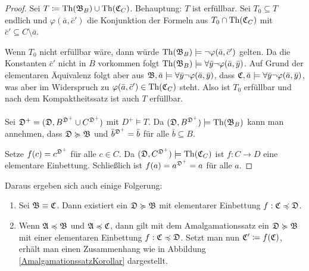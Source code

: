 \begin{proof}
	Sei $T\coloneqq \operatorname{Th}(\mathfrak{B}_B)\cup \operatorname{Th}(\mathfrak{C}_C)$. Behauptung: $T$ ist erfüllbar. Sei $T_0\subseteq T$ endlich und $\varphi(\bar{a},\bar{c}')$ die Konjunktion der Formeln aus $T_0\cap \operatorname{Th}(\mathfrak{C}_C)$ mit $\bar{c}'\subseteq C\setminus \bar{a}$.
	
	Wenn $T_0$ nicht erfüllbar wäre, dann würde $\operatorname{Th}(\mathfrak{B}_B)\models\neg\varphi(\bar{a},\bar{c}')$ gelten. 
	Da die Konstanten $\bar{c}'$ nicht in $B$ vorkommen folgt $\operatorname{Th}(\mathfrak{B}_B)\models\forall\bar{y}\neg\varphi(\bar{a},\bar{y})$.
	Auf Grund der elementaren Äquivalenz folgt aber aus $\mathfrak{B},\bar{a}\models\forall\bar{y}\neg\varphi(\bar{a},\bar{y})$, dass $\mathfrak{C},\bar{a}\models\forall\bar{y}\neg\varphi(\bar{a},\bar{y})$, was aber im Widerspruch zu $\varphi(\bar{a},\bar{c}')\in \operatorname{Th}(\mathfrak{C}_C)$ steht. 
	Also ist $T_0$ erfüllbar und nach dem Kompaktheitssatz ist auch $T$ erfüllbar.
	\\
	\\
	Sei $\mathfrak{D}^+=(\mathfrak{D}, B^{\mathfrak{D}^+}\cup C^{\mathfrak{D}^+})$ mit $D^+\models T$. Da $(\mathfrak{D},B^{\mathfrak{D}^+})\models \operatorname{Th}(\mathfrak{B}_B)$ kann man annehmen, dass $\mathfrak{D}\succcurlyeq\mathfrak{B}$ und $\bar{b}^{\mathfrak{D}^+}=\bar{b}$ für alle $\bar{b}\subseteq B$.
	
	Setze $f(c)=c^{\mathfrak{D}^+}$ für alle $c\in C$. Da $(\mathfrak{D},C^{\mathfrak{D}^+})\models \operatorname{Th}(\mathfrak{C}_C)$ ist $f:C\to D$ eine elementare Einbettung. 
	Schließlich ist $f(a)=a^{\mathfrak{D}^+}=a$ für alle $a$.
\end{proof}

Daraus ergeben sich auch einige Folgerung: 
\begin{enumerate}
	\item Sei $\mathfrak{B}\equiv \mathfrak{C}$. Dann existiert ein $\mathfrak{D}\succcurlyeq\mathfrak{B}$ mit elementarer Einbettung $f:\mathfrak{C}\preccurlyeq\mathfrak{D}$.
	\item Wenn $\mathfrak{A}\preccurlyeq\mathfrak{B}$ und $\mathfrak{A}\preccurlyeq\mathfrak{C}$, dann gilt mit dem Amalgamationssatz ein $\mathfrak{D}\succcurlyeq\mathfrak{B}$ mit einer elementaren Einbettung $f:\mathfrak{C}\preccurlyeq\mathfrak{D}$. Setzt man nun $\mathfrak{C}'\coloneqq f(\mathfrak{C})$, erhält man einen Zusammenhang wie in Abbildung \ref{AmalgamationssatzKorollar} dargestellt.
\end{enumerate}


